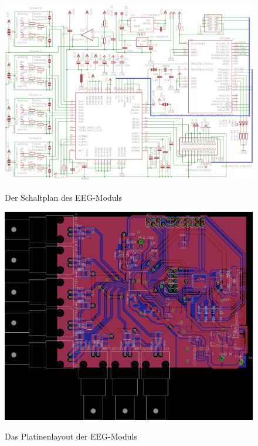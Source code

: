 \documentclass[12pt,a4paper,notitlepage]{article}
\begin{document}
\begin{landscape}
\begin{figure}
\begin{center}
\includegraphics{images/adc_schematic_02.eps}
\label{adc_schematic}
\caption{Der Schaltplan des EEG-Moduls}
\end{center}
\end{figure}
\end{landscape}

\begin{figure}
\centering
\includegraphics{images/adc_board_03.eps}%
\label{adc_board}
\caption{Das Platinenlayout der EEG-Moduls}
\end{figure}
\end{document}
